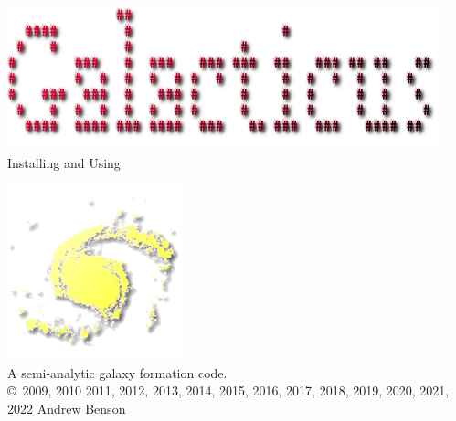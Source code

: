\documentclass[letterpaper,10pt,headsepline]{scrbook}
\begin{document}
\lstset{language=[95]Fortran}

\frontmatter

\pagestyle{empty}
\begin{center}
\includegraphics[width=125mm]{GalacticusLogo.png}\\

\Huge Installing and Using \normalsize

\includegraphics{New_Logo_Galaxy_192_Transparent.png}\\
A semi-analytic galaxy formation code.\\

\copyright\ 2009, 2010 2011, 2012, 2013, 2014, 2015, 2016, 2017, 2018, 2019, 2020, 2021, 2022 Andrew Benson
\end{center}

\tableofcontents

\mainmatter
\pagestyle{headings}










\backmatter






\printglossaries

\citeindextrue
\printindex
\end{document}
